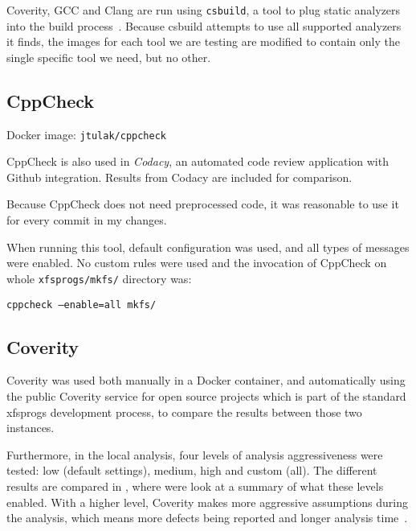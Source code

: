 Coverity, GCC and Clang are run using {\tt csbuild}, a tool to plug static
analyzers into the build process~\cite{csbuildMan}. Because csbuild attempts to
use all supported analyzers it finds, the images for each tool we are testing
are modified to contain only the single specific tool we need, but no other.
%
\subsection{CppCheck}
Docker image: {\tt jtulak/cppcheck}~\cite{dockerCPPCheck}

CppCheck is also used in {\em Codacy}, an automated code review application
with Github integration. Results from Codacy are included for comparison.

Because CppCheck does not need preprocessed code, it was reasonable to use
it for every commit in my changes.

When running this tool, default configuration was used, and all types of
messages were enabled. No custom rules were used and the invocation of
CppCheck on whole {\tt xfsprogs/mkfs/} directory was:

{\tt cppcheck --enable=all mkfs/}


\subsection{Coverity}
Coverity was used both manually in a Docker container, and automatically
using the public Coverity service for open source projects which is part
of the standard xfsprogs development process, to compare the results between
those two instances.

Furthermore, in the local analysis, four levels of analysis aggressiveness were
tested: low (default settings), medium, high and custom (all). The different
results are compared in , where were look at a
summary of what these levels enabled. With a higher level, Coverity makes more
aggressive assumptions during the analysis, which means more defects being
reported and longer analysis time~\cite{coverityMan}.

